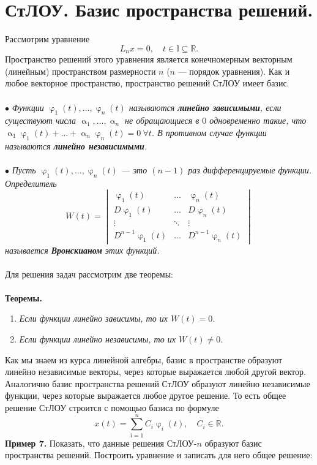 \documentclass[a4paper, 12pt]{article}
\newcommand{\Rm}{\mathbb{R}}
\newcommand{\I}{\mathbb{I}}
\renewcommand{\varphi}{\upvarphi}
\renewcommand{\alpha}{\upalpha}
\begin{document}
	\section*{СтЛОУ. Базис пространства решений.}
	Рассмотрим уравнение $$L_nx = 0,\quad t\in \I\subseteq\Rm.$$
	Пространство решений этого уравнения является конечномерным векторным (линейным) пространством размерности $n$ ($n$ --- порядок уравнения). Как и любое векторное пространство, пространство решений СтЛОУ имеет базис.\\\\
	$\bullet$ \textit{Функции $\varphi_1(t),\ldots,\varphi_n(t)$ называются \textbf{линейно зависимыми}, если существуют числа $\alpha_1,\ldots, \alpha_n$ не обращающиеся в $0$ одновременно такие, что $\alpha_1\varphi_1(t) + \ldots + \alpha_n\varphi_n(t) = 0\ \forall t$. В противном случае функции называются \textbf{линейно независимыми}.}\\\\
	$\bullet$ \textit{Пусть $\varphi_1(t),\ldots,\varphi_n(t)$ --- это $(n-1)$ раз дифференцируемые функции. Определитель $$W(t) = \begin{vmatrix}
			\varphi_1(t) & \dots & \varphi_n(t)\\
			D\varphi_1(t) & \dots & D\varphi_n(t)\\
			\vdots & \ddots & \vdots\\
			D^{n-1}\varphi_1(t) & \dots & D^{n-1}\varphi_n(t)
	\end{vmatrix}$$ называется \textbf{Вронскианом} этих функций.}\\\\
	Для решения задач рассмотрим две теоремы:\\\\
	\textbf{Теоремы.}\begin{enumerate}
		\item \textit{Если функции линейно зависимы, то их $W(t) = 0$.}
		\item \textit{Если функции линейно независимы, то их $W(t) \ne 0$.}
	\end{enumerate}
	Как мы знаем из курса линейной алгебры, базис в пространстве образуют линейно независимые векторы, через которые выражается любой другой вектор. Аналогично базис пространства решений СтЛОУ образуют линейно независимые функции, через которые выражается любое другое решение. То есть общее решение СтЛОУ строится с помощью базиса по формуле $$x(t) = \sum_{i = 1}^{n}C_i\varphi_i(t),\quad C_i \in \Rm.$$
	\textbf{Пример 7.} Показать, что данные решения СтЛОУ-$n$ образуют базис пространства решений. Построить уравнение и записать для него общее решение:
\end{document}
